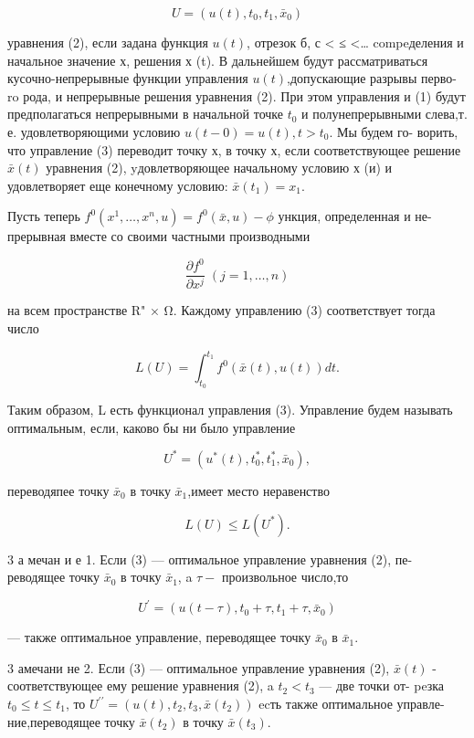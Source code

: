 \documentclass[10pt]{article}
\begin{document}
\[
U = \left( {u\left( t\right),{t}_{0},{t}_{1},{\bar{x}}_{0}}\right) \tag{3}
\]

уравнения (2), если задана функция \(u\left( t\right)\), отрезок б, с < ≤ <… compeделения и начальное значение х, решения х (t). В дальнейшем будут рассматриваться кусочно-непрерывные функции управления \(u\left( t\right)\),допускающие разрывы перво- ro рода, и непрерывные решения уравнения (2). При этом управления и (1) будут предполагаться непрерывными в начальной точке \({t}_{0}\) и полунепрерывными слева,т. е. удовлетворяющими условию \(u\left( {t - 0}\right)  = u\left( t\right),t > {t}_{0}\). Мы будем го- ворить, что управление (3) переводит точку х, в точку х, если соответствующее решение \(\bar{x}\left( t\right)\) уравнения (2), yдовлетворяющее начальному условию х (и) и удовлетворяет еще конечному условию: \(\bar{x}\left( {t}_{1}\right)  = {x}_{1}\).

Пусть теперь \({f}^{0}\left( {{x}^{1},\ldots,{x}^{n},u}\right)  = {f}^{0}\left( {\bar{x},u}\right)  - \phi\) ункция, определенная и не- прерывная вместе со своими частными производными

\[
\frac{\partial {f}^{0}}{\partial {x}^{j}}\;\left( {j = 1,\ldots,n}\right)
\]

на всем пространстве R" × Ω. Каждому управлению (3) соответствует тогда число

\[
L\left( U\right)  = {\int }_{{t}_{0}}^{{t}_{1}}{f}^{0}\left( {\bar{x}\left( t\right),u\left( t\right) }\right) {dt}.
\]

Таким образом, L есть функционал управления (3). Управление будем называть оптимальным, если, каково бы ни было управление

\[
{U}^{ * } = \left( {{u}^{ * }\left( t\right),{t}_{0}^{ * },{t}_{1}^{ * },{\bar{x}}_{0}}\right),
\]

переводяпее точку \({\bar{x}}_{0}\) в точку \({\bar{x}}_{1}\),имеет место неравенство

\[
L\left( U\right)  \leq  L\left( {U}^{ * }\right).
\]

3 а мечан и е 1. Если (3) — оптимальное управление уравнения (2), пе- реводящее точку \({\bar{x}}_{0}\) в точку \({\bar{x}}_{1}\), a \(\tau  -\) произвольное число,то

\[
{U}^{\prime } = \left( {u\left( {t - \tau }\right),{t}_{0} + \tau,{t}_{1} + \tau,{\bar{x}}_{0}}\right)
\]

— также оптимальное управление, переводящее точку \({\bar{x}}_{0}\) в \({\bar{x}}_{1}\).

3 амечани не 2. Если (3) — оптимальное управление уравнения (2), \(\bar{x}\left( t\right)\) - соответствующее ему решение уравнения (2), a \({t}_{2} < {t}_{3}\) — две точки от- peзка \({t}_{0} \leq  t \leq  {t}_{1}\), то \({U}^{\prime \prime } = \left( {u\left( t\right),{t}_{2},{t}_{3},\bar{x}\left( {t}_{2}\right) }\right)\) ecть также оптимальное управле- ние,переводящее точку \(\bar{x}\left( {t}_{2}\right)\) в точку \(\bar{x}\left( {t}_{3}\right)\).
\end{document}
